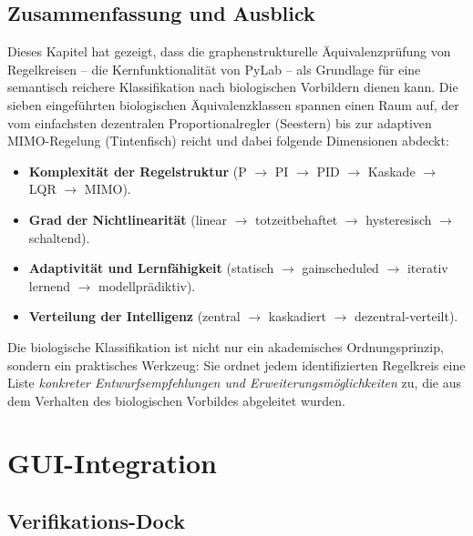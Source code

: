 \documentclass[a4paper,12pt]{article}
\theoremstyle{definition}
\begin{document}
\subsection{Zusammenfassung und Ausblick}
\label{subsec:bio_zusammenfassung}

Dieses Kapitel hat gezeigt, dass die graphenstrukturelle Äquivalenzprüfung
von Regelkreisen -- die Kernfunktionalität von PyLab -- als Grundlage für eine
semantisch reichere Klassifikation nach biologischen Vorbildern dienen kann.
Die sieben eingeführten biologischen Äquivalenzklassen spannen einen
Raum auf, der vom einfachsten dezentralen Proportionalregler (Seestern)
bis zur adaptiven MIMO-Regelung (Tintenfisch) reicht und dabei folgende
Dimensionen abdeckt:

\begin{itemize}
	\item \textbf{Komplexität der Regelstruktur} (P $\to$ PI $\to$ PID $\to$
	Kaskade $\to$ LQR $\to$ MIMO).
	\item \textbf{Grad der Nichtlinearität} (linear $\to$ totzeitbehaftet $\to$
	hysteresisch $\to$ schaltend).
	\item \textbf{Adaptivität und Lernfähigkeit} (statisch $\to$ gainscheduled
	$\to$ iterativ lernend $\to$ modellprädiktiv).
	\item \textbf{Verteilung der Intelligenz} (zentral $\to$ kaskadiert $\to$
	dezentral-verteilt).
\end{itemize}

Die biologische Klassifikation ist nicht nur ein akademisches Ordnungsprinzip,
sondern ein praktisches Werkzeug: Sie ordnet jedem identifizierten Regelkreis
eine Liste \emph{konkreter Entwurfsempfehlungen und Erweiterungsmöglichkeiten}
zu, die aus dem Verhalten des biologischen Vorbildes abgeleitet wurden.

\section{GUI-Integration}
\label{sec:gui}

\subsection{Verifikations-Dock}
\end{document}
